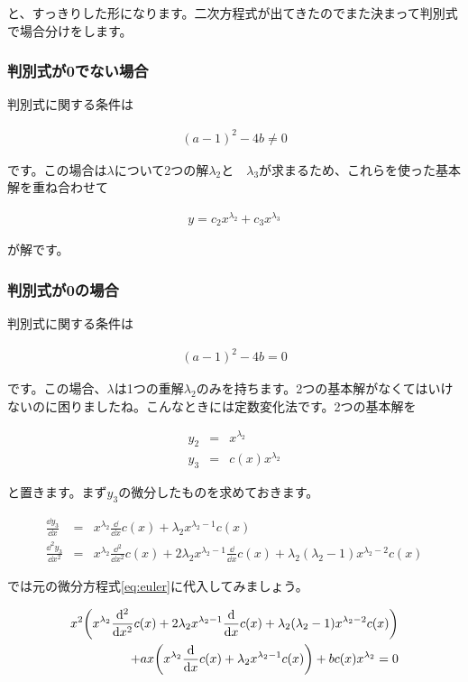 \noindent
と、すっきりした形になります。二次方程式が出てきたのでまた決まって判別式で場合分けをします。

\subsubsection{判別式が0でない場合}
判別式に関する条件は

\begin{eqnarray}
    (a-1)^2-4b\neq0
\end{eqnarray}

\noindent
です。この場合は$\lambda$について2つの解$\lambda_2$と　$\lambda_3$が求まるため、これらを使った基本解を重ね合わせて

\begin{eqnarray}
    y=c_2x^{\lambda_2}+c_3x^{\lambda_3}
\end{eqnarray}

\noindent
が解です。

\subsubsection{判別式が0の場合}
判別式に関する条件は

\begin{eqnarray}
    (a-1)^2-4b=0
\end{eqnarray}

です。この場合、$\lambda$は1つの重解$\lambda_2$のみを持ちます。2つの基本解がなくてはいけないのに困りましたね。こんなときには定数変化法です。2つの基本解を

\begin{eqnarray}
    y_2&=&x^{\lambda_2} \\
    y_3&=&c(x)x^{\lambda_2}
\end{eqnarray}

\noindent
と置きます。まず$y_3$の微分したものを求めておきます。

\begin{eqnarray}
    \frac{\dd y_3}{\dd x}&=&x^{\lambda_2}\frac{\dd}{\dd x}c(x)+\lambda_2x^{\lambda_2-1}c(x) \\
    \frac{\dd^2 y_3}{\dd x^2}&=&x^{\lambda_2}\frac{\dd^2}{\dd x^2}c(x)+2\lambda_2x^{\lambda_2-1}\frac{\dd}{\dd x}c(x)+\lambda_2(\lambda_2-1)x^{\lambda_2-2}c(x)
\end{eqnarray}

では元の微分方程式\ref{eq:euler}に代入してみましょう。

\begin{eqnarray}
    x^2\pqty{x^{\lambda_2}\frac{\dd^2}{\dd x^2}c(x)+2\lambda_2x^{\lambda_2-1}\frac{\dd}{\dd x}c(x)+\lambda_2(\lambda_2-1)x^{\lambda_2-2}c(x)} \nonumber \\
    +ax\pqty{x^{\lambda_2}\frac{\dd}{\dd x}c(x)+\lambda_2x^{\lambda_2-1}c(x)}+bc(x)x^{\lambda_2}=0
\end{eqnarray}

